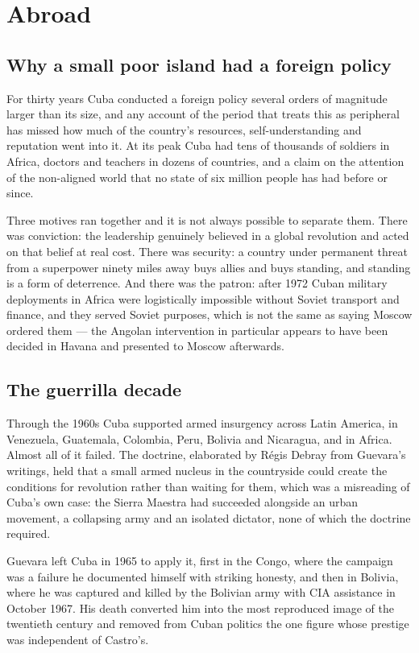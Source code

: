 \chapter{Abroad}
\label{ch:internationalism}

\section{Why a small poor island had a foreign policy}

For thirty years Cuba conducted a foreign policy several orders of magnitude
larger than its size, and any account of the period that treats this as
peripheral has missed how much of the country's resources, self-understanding
and reputation went into it. At its peak Cuba had tens of thousands of soldiers
in Africa, doctors and teachers in dozens of countries, and a claim on the
attention of the non-aligned world that no state of six million people has had
before or since.

Three motives ran together and it is not always possible to separate them.
There was conviction: the leadership genuinely believed in a global revolution
and acted on that belief at real cost. There was security: a country under
permanent threat from a superpower ninety miles away buys allies and buys
standing, and standing is a form of deterrence. And there was the patron: after
1972 Cuban military deployments in Africa were logistically impossible without
Soviet transport and finance, and they served Soviet purposes, which is not the
same as saying Moscow ordered them --- the Angolan intervention in particular
appears to have been decided in Havana and presented to Moscow afterwards.

\section{The guerrilla decade}

Through the 1960s Cuba supported armed insurgency across Latin America, in
Venezuela, Guatemala, Colombia, Peru, Bolivia and Nicaragua, and in Africa.
Almost all of it failed. The doctrine, elaborated by R\'egis Debray from
Guevara's writings, held that a small armed nucleus in the countryside could
create the conditions for revolution rather than waiting for them, which was a
misreading of Cuba's own case: the Sierra Maestra had succeeded alongside an
urban movement, a collapsing army and an isolated dictator, none of which the
doctrine required.

Guevara left Cuba in 1965 to apply it, first in the Congo, where the campaign
was a failure he documented himself with striking honesty, and then in Bolivia,
where he was captured and killed by the Bolivian army with CIA assistance in
October 1967. His death converted him into the most reproduced image of the
twentieth century and removed from Cuban politics the one figure whose prestige
was independent of Castro's.

